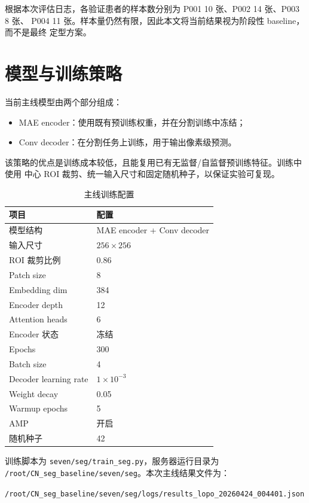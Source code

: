 \documentclass[UTF8,11pt]{ctexart}
\begin{document}
根据本次评估日志，各验证患者的样本数分别为 P001 10 张、P002 14 张、P003 8 张、
P004 11 张。样本量仍然有限，因此本文将当前结果视为阶段性 baseline，而不是最终
定型方案。

\section{模型与训练策略}

当前主线模型由两个部分组成：

\begin{itemize}
  \item MAE encoder：使用既有预训练权重，并在分割训练中冻结；
  \item Conv decoder：在分割任务上训练，用于输出像素级预测。
\end{itemize}

该策略的优点是训练成本较低，且能复用已有无监督/自监督预训练特征。训练中使用
中心 ROI 裁剪、统一输入尺寸和固定随机种子，以保证实验可复现。

\begin{table}[htbp]
\centering
\caption{主线训练配置}
\label{tab:config}
\begin{tabular}{ll}
\toprule
项目 & 配置 \\
\midrule
模型结构 & MAE encoder + Conv decoder \\
输入尺寸 & $256 \times 256$ \\
ROI 裁剪比例 & 0.86 \\
Patch size & 8 \\
Embedding dim & 384 \\
Encoder depth & 12 \\
Attention heads & 6 \\
Encoder 状态 & 冻结 \\
Epochs & 300 \\
Batch size & 4 \\
Decoder learning rate & $1 \times 10^{-3}$ \\
Weight decay & 0.05 \\
Warmup epochs & 5 \\
AMP & 开启 \\
随机种子 & 42 \\
\bottomrule
\end{tabular}
\end{table}

训练脚本为 \texttt{seven/seg/train\_seg.py}，服务器运行目录为
\texttt{/root/CN\_seg\_baseline/seven/seg}。本次主线结果文件为：

\begin{center}
\texttt{/root/CN\_seg\_baseline/seven/seg/logs/results\_lopo\_20260424\_004401.json}
\end{center}
\end{document}

